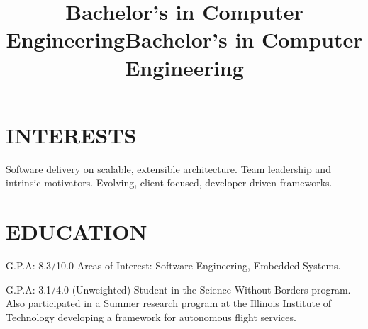 \documentclass[margin, 10pt]{res} %
\begin{document}
\address{guilherme\_abinader@hotmail.com}
\address{github.com/guilhermesimas}
\address{+55 (21) 99424 6137}


\begin{resume}

 
\section{INTERESTS}  

Software delivery on scalable, extensible architecture. Team leadership and intrinsic motivators. Evolving, client-focused, developer-driven frameworks.


\section{EDUCATION}
\title{Bachelor's in Computer Engineering}
\begin{position}
	G.P.A: 8.3/10.0 Areas of Interest: Software Engineering, Embedded Systems.
\end{position}
\title{Bachelor's in Computer Engineering}
\begin{position}
	G.P.A: 3.1/4.0 (Unweighted) Student in the Science Without Borders program. Also participated in a Summer research program at the Illinois Institute of Technology developing a framework for autonomous flight services.
\end{position}



\end{resume}
\end{document}

